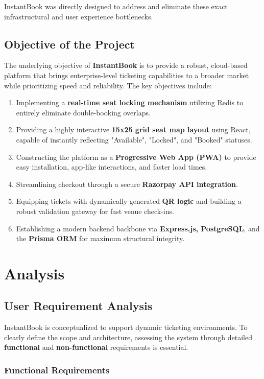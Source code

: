 \documentclass[12pt,a4paper]{report}
\begin{document}
InstantBook was directly designed to address and eliminate these exact infrastructural and user experience bottlenecks.

\section{Objective of the Project}
The underlying objective of \textbf{InstantBook} is to provide a robust, cloud-based platform that brings enterprise-level ticketing capabilities to a broader market while prioritizing speed and reliability. The key objectives include:
\begin{enumerate}
    \item Implementing a \textbf{real-time seat locking mechanism} utilizing Redis to entirely eliminate double-booking overlaps.
    \item Providing a highly interactive \textbf{15x25 grid seat map layout} using React, capable of instantly reflecting "Available", "Locked", and "Booked" statuses.
    \item Constructing the platform as a \textbf{Progressive Web App (PWA)} to provide easy installation, app-like interactions, and faster load times.
    \item Streamlining checkout through a secure \textbf{Razorpay API integration}.
    \item Equipping tickets with dynamically generated \textbf{QR logic} and building a robust validation gateway for fast venue check-ins.
    \item Establishing a modern backend backbone via \textbf{Express.js, PostgreSQL}, and the \textbf{Prisma ORM} for maximum structural integrity.
\end{enumerate}

\chapter{Analysis}

\section{User Requirement Analysis}

InstantBook is conceptualized to support dynamic ticketing environments. To clearly define the scope and architecture, assessing the system through detailed \textbf{functional} and \textbf{non-functional} requirements is essential.

\subsection{Functional Requirements}
\end{document}
